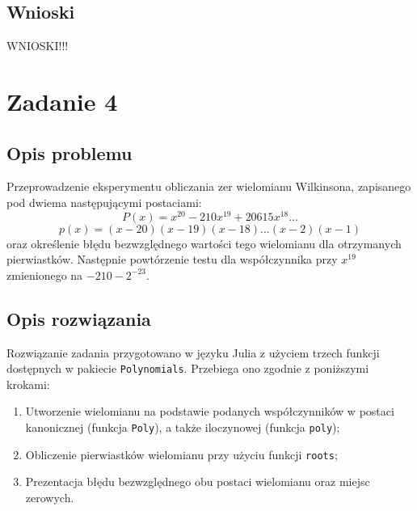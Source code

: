 \documentclass{classrep}
\begin{document}
	\subsection{Wnioski}
		WNIOSKI!!!
\section{Zadanie 4}
	\subsection{Opis problemu}
		Przeprowadzenie eksperymentu obliczania zer wielomianu Wilkinsona, zapisanego pod dwiema następującymi postaciami:
		$$P(x) = x^{20}-210x^{19}+20615x^{18} \dots $$
		$$p(x) = (x-20)(x-19)(x-18)\dots (x-2)(x-1)$$
		oraz określenie błędu bezwzględnego wartości tego wielomianu dla otrzymanych pierwiastków.
		Następnie powtórzenie testu dla współczynnika przy $x^{19}$ zmienionego na $-210-2^{-23}$.
	\subsection{Opis rozwiązania}
		Rozwiązanie zadania przygotowano w języku Julia z użyciem trzech funkcji dostępnych w pakiecie \texttt{Polynomials}. Przebiega ono zgodnie z poniższymi krokami:
		\begin{enumerate}[1.]
			\item Utworzenie wielomianu na podstawie podanych współczynników w postaci kanonicznej (funkcja \texttt{Poly}), a także iloczynowej (funkcja \texttt{poly});
			\item Obliczenie pierwiastków wielomianu przy użyciu funkcji \texttt{roots};
			\item Prezentacja błędu bezwzględnego obu postaci wielomianu oraz miejsc zerowych.
		\end{enumerate}
\end{document}
